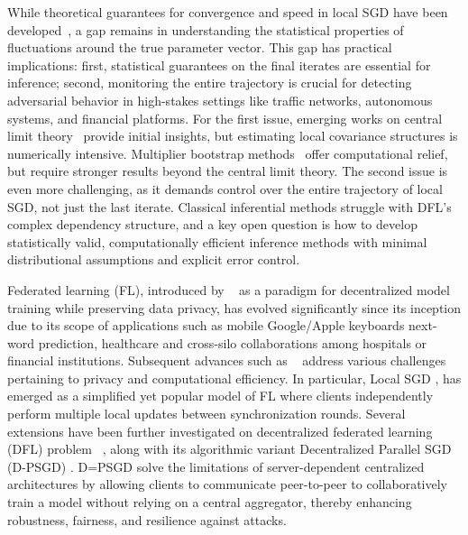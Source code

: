 \documentclass[a4paper,11pt]{article}
\numberwithin{equation}{section}
\theoremstyle{plain}
\theoremstyle{remark}
\begin{document}
While theoretical guarantees for convergence and speed in local SGD have been developed~\cite{haddadpour2019convergence, woodworth2020local, koloskova2020unified}, a gap remains in understanding the statistical properties of fluctuations around the true parameter vector. This gap has practical implications: first, statistical guarantees on the final iterates are essential for inference; second, monitoring the entire trajectory is crucial for detecting adversarial behavior in high-stakes settings like traffic networks, autonomous systems, and financial platforms. For the first issue, emerging works on central limit theory~\cite{li2022statistical, songxichen2024} provide initial insights, but estimating local covariance structures is numerically intensive. Multiplier bootstrap methods~\cite{fang2018jmlr, fang2019sjs} offer computational relief, but require stronger results beyond the central limit theory. The second issue is even more challenging, as it demands control over the entire trajectory of local SGD, not just the last iterate. Classical inferential methods struggle with DFL’s complex dependency structure, and a key open question is how to develop statistically valid, computationally efficient inference methods with minimal distributional assumptions and explicit error control.


\iffalse
Federated learning (FL), introduced by ~\cite{mcmahan2017communication} as a paradigm for decentralized model training while preserving data privacy, has evolved significantly since its inception due to its scope of applications such as mobile Google/Apple keyboards next-word prediction, healthcare and cross-silo collaborations among hospitals or financial institutions. Subsequent advances such as  ~\cite{kairouz2019advances, li2020federated,karimireddy2020scaffold, wang2020tackling, alistarh2017qsgd, lin2018don} address various challenges pertaining to privacy and computational efficiency. In particular, Local SGD \cite{stich2018local}, has emerged as a simplified yet popular model of FL where clients independently perform multiple local updates between synchronization rounds. Several extensions have been further investigated on decentralized federated learning (DFL)  problem ~\cite{lalitha2019peer, lian2017can, he2019central, kim2020blockchained}, along with its algorithmic variant Decentralized Parallel SGD (D-PSGD) \cite{lian2017can, wang2021, he2023decentralized, singh2023privacy}. D=PSGD solve the limitations of server-dependent centralized architectures by allowing clients to communicate peer-to-peer to collaboratively train a model without relying on a central aggregator, thereby enhancing robustness, fairness, and resilience against attacks.
\end{document}
